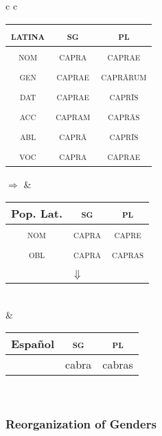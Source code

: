 \documentclass{report}
\begin{document}
\begin{tabular}{c c}
  \begin{tabular}{|c|c|c|}
    \hline
    \textsc{latina} & \textsc{sg} & \textsc{pl} \\
    \hline
    \textsc{nom} & \cellcolor{gray} \textsc{capra} & \cellcolor{yellow} \textsc{caprae} \\
    \hline
    \textsc{gen} & \textsc{caprae} & \textsc{capr\={a}rum} \\
    \hline
    \textsc{dat} & \textsc{caprae} & \textsc{capr\={i}s} \\
    \hline
    \textsc{acc} & \cellcolor{cyan} \textsc{capram} & \cellcolor{red} \textsc{capr\={a}s} \\
    \hline
    \textsc{abl} & \textsc{capr\={a}} & \textsc{capr\={i}s} \\
    \hline
    \textsc{voc} & \textsc{capra} & \textsc{caprae} \\
    \hline
  \end{tabular} \quad $\Rightarrow$ &
                                      \begin{tabular}{|c|c|c|}
                                        \hline
                                        Pop. Lat. & \textsc{sg} & \textsc{pl} \\
                                        \hline
                                        \textsc{nom} & \cellcolor{gray} \textsc{capra} & \cellcolor{yellow} \textsc{capre} \\
                                        \hline
                                        \textsc{obl} & \cellcolor{cyan} \textsc{capra} & \cellcolor{red} \textsc{capras} \\
                                        \hline
                                        \multicolumn{3}{c}{} \\
                                        \multicolumn{3}{c}{$\Downarrow$}
                                      \end{tabular} \\
  &
  \begin{tabular}{|c|c|c|}
    \hline
    Español & \textsc{sg} & \textsc{pl} \\
    \hline
    & \cellcolor{cyan} cabra & \cellcolor{red} cabras \\
    \hline
  \end{tabular} \\
\end{tabular}

\subsubsection{Reorganization of Genders}
\end{document}
